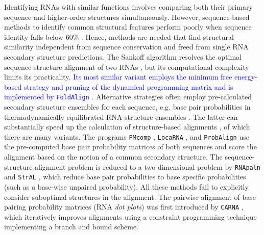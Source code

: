 \documentclass{bmcart}
\newcommand\locarna{\texttt{LocaRNA}}
\newcommand\carna{\texttt{CARNA}}
\begin{document}
Identifying RNAs with similar functions involves comparing both their primary
sequence and higher-order structures simultaneously. However, sequence-based
methods to identify common structural features perform poorly when sequence
identity falls below 60\%  \cite{Gardner15860779}. Hence, methods are needed
that find structural similarity independent from sequence conservation and
freed from single RNA secondary structure predictions. The Sankoff algorithm
resolves the optimal sequence-structure alignment of two RNAs \cite{sankoff85},
but its computational complexity limits its practicality.  \textcolor{blue}{Its most similar
variant employs the minimum free energy-based strategy and pruning of the
dynamical programming matrix and is implemented by \texttt{FoldAlign}
\cite{Havgaard17937495,Sundfeld26704597}.} Alternative strategies often employ
pre-calculated secondary structure ensembles for each sequence, e.g. base pair
probabilities in thermodynamically equilibrated RNA structure ensembles
\cite{McCaskill:1990}. The latter can substantially speed up the calculation of
structure-based alignments \cite{Hofacker15073017}, of which there are many
variants.  The programs \texttt{PMcomp} \cite{Hofacker15073017}, \locarna{}
\cite{Will17432929}, and \texttt{ProbAlign} \cite{Roshan16954142} use the
pre-computed base pair probability matrices of both sequences and score the
alignment based on the notion of a common secondary structure. The
sequence-structure alignment problem is reduced to a two-dimensional problem by
\texttt{RNApaln} \cite{Lorenz22115189} and \texttt{StrAL} \cite{Dalli16613908},
which reduce base pair probabilities to base specific probabilities (such as a
base-wise unpaired probability). All these methods fail to explicitly consider
suboptimal structures in the alignment. The pairwise alignment of base pairing
probability matrices (RNA \emph{dot plots}) was first introduced by \carna{}
\cite{Palu2010,Sorescu2012}, which iteratively improves alignments using a
constraint programming technique implementing a branch and bound scheme. \\ 
\end{document}
